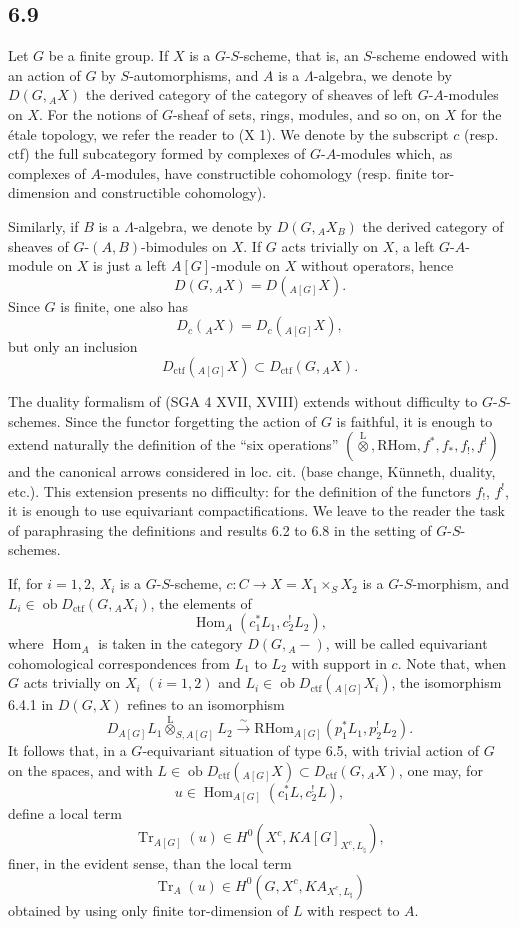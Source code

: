 \documentclass[11pt]{article}
\DeclareMathOperator{\Hom}{Hom}
\providecommand{\RHom}{\mathrm{RHom}}
\providecommand{\Tr}{\operatorname{Tr}}
\providecommand{\Tr}{\operatorname{Tr}}
\providecommand{\lten}{\overset{\mathrm L}{\otimes}}
\providecommand{\Ob}{\operatorname{ob}}
\providecommand{\Tr}{\operatorname{Tr}}
\providecommand{\RHom}{\mathrm{RHom}}
\providecommand{\Hom}{\operatorname{Hom}}
\providecommand{\lten}{\overset{\mathrm L}{\otimes}}
\providecommand{\RHom}{\mathrm R\mathcal{H}om}
\providecommand{\lten}{\overset{\mathrm L}{\otimes}}
\providecommand{\Ob}{\operatorname{ob}}
\providecommand{\Tr}{\operatorname{Tr}}
\providecommand{\lten}{\overset{\mathrm L}{\otimes}}
\providecommand{\lten}{\overset{\mathrm L}{\otimes}}
\providecommand{\Ob}{\operatorname{Ob}}
\providecommand{\lten}{\overset{\mathrm L}{\otimes}}
\providecommand{\RHom}{\mathrm{RHom}}
\begin{document}
\subsection*{6.9}
Let $G$ be a finite group. If $X$ is a $G$-$S$-scheme, that is, an $S$-scheme endowed with an action of $G$ by $S$-automorphisms, and $A$ is a $\Lambda$-algebra, we denote by $D(G,{}_AX)$ the derived category of the category of sheaves of left $G$-$A$-modules on $X$. For the notions of $G$-sheaf of sets, rings, modules, and so on, on $X$ for the étale topology, we refer the reader to (X 1). We denote by the subscript $c$ (resp. ctf) the full subcategory formed by complexes of $G$-$A$-modules which, as complexes of $A$-modules, have constructible cohomology (resp. finite tor-dimension and constructible cohomology).

Similarly, if $B$ is a $\Lambda$-algebra, we denote by $D(G,{}_AX_B)$ the derived category of sheaves of $G$-$(A,B)$-bimodules on $X$. If $G$ acts trivially on $X$, a left $G$-$A$-module on $X$ is just a left $A[G]$-module on $X$ without operators, hence
\[
D(G,{}_AX)=D({}_{A[G]}X).
\]
Since $G$ is finite, one also has
\[
D_c({}_AX)=D_c({}_{A[G]}X),
\]
but only an inclusion
\[
D_{\mathrm{ctf}}({}_{A[G]}X)\subset D_{\mathrm{ctf}}(G,{}_AX).
\]

The duality formalism of (SGA 4 XVII, XVIII) extends without difficulty to $G$-$S$-schemes. Since the functor forgetting the action of $G$ is faithful, it is enough to extend naturally the definition of the “six operations” $(\lten,\RHom,f^*,f_*,f_!,f^!)$ and the canonical arrows considered in loc. cit. (base change, Künneth, duality, etc.). This extension presents no difficulty: for the definition of the functors $f_!$, $f^!$, it is enough to use equivariant compactifications. We leave to the reader the task of paraphrasing the definitions and results 6.2 to 6.8 in the setting of $G$-$S$-schemes.

If, for $i=1,2$, $X_i$ is a $G$-$S$-scheme, $c:C\to X=X_1\times_SX_2$ is a $G$-$S$-morphism, and $L_i\in\Ob D_{\mathrm{ctf}}(G,{}_AX_i)$, the elements of
\[
\Hom_A(c_1^*L_1,c_2^!L_2),
\]
where $\Hom_A$ is taken in the category $D(G,{}_A-)$, will be called equivariant cohomological correspondences from $L_1$ to $L_2$ with support in $c$. Note that, when $G$ acts trivially on $X_i$ $(i=1,2)$ and $L_i\in\Ob D_{\mathrm{ctf}}({}_{A[G]}X_i)$, the isomorphism 6.4.1 in $D(G,X)$ refines to an isomorphism
\[
D_{A[G]}L_1\lten_{S,A[G]}L_2
\xrightarrow{\sim}
\RHom_{A[G]}(p_1^*L_1,p_2^!L_2).
\]
It follows that, in a $G$-equivariant situation of type 6.5, with trivial action of $G$ on the spaces, and with $L\in\Ob D_{\mathrm{ctf}}({}_{A[G]}X)\subset D_{\mathrm{ctf}}(G,{}_AX)$, one may, for
\[
u\in\Hom_{A[G]}(c_1^*L,c_2^!L),
\]
define a local term
\[
\Tr_{A[G]}(u)\in H^0(X^c,KA[G]_{X^c,L_{\natural}}),
\]
finer, in the evident sense, than the local term
\[
\Tr_A(u)\in H^0(G,X^c,KA_{X^c,L_{\natural}})
\]
obtained by using only finite tor-dimension of $L$ with respect to $A$.
\end{document}
